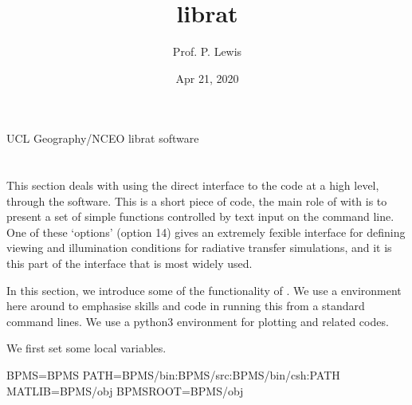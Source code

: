 \documentclass[letterpaper,10pt,english]{sphinxmanual}
\title{librat}
\date{Apr 21, 2020}
\author{Prof.\@{} P.\@{} Lewis}
\let\sphinxpxdimen\pdfpxdimen\else\newdimen\sphinxpxdimen
\begin{document}
\pagestyle{empty}
\sphinxmaketitle
\pagestyle{plain}
\sphinxtableofcontents
\pagestyle{normal}
\label{\detokenize{index::doc}}


UCL Geography/NCEO librat software

\sphinxincludegraphics[width=262\sphinxpxdimen,height=85\sphinxpxdimen]{{ucl_logo}.png}


\chapter{}
\label{\detokenize{RATstart:RATstart}}\label{\detokenize{RATstart::doc}}
This section deals with using the direct interface to the  code at a high level, through the  software. This is a short piece of  code, the main role of with is to present a set of simple functions controlled by text input on the command line. One of these ‘options’ (option 14) gives an extremely fexible interface for defining viewing and illumination conditions for radiative transfer simulations, and it is this part of the interface that is most widely used.

In this section, we introduce some of the functionality of . We use a  environment here around  to emphasise skills and code in running this from a standard  command lines. We use a python3 environment for plotting and related codes.

We first set some local variables.

{
\begin{sphinxVerbatim}[commandchars=\\\{\}]
\llap{\color{nbsphinxin}[1]:\,\hspace{\fboxrule}\hspace{\fboxsep}} 
   
 BPMS=\PYGZdl{}BPMS
 PATH=\PYGZdl{}BPMS/bin:\PYGZdl{}BPMS/src:\PYGZdl{}BPMS/bin/csh:\PYGZdl{}PATH\PYGZus{}
 MATLIB=\PYGZdl{}BPMS/obj
 BPMSROOT=\PYGZdl{}BPMS/obj
\end{sphinxVerbatim}
}
\end{document}
